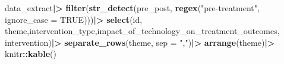 \documentclass[
]{article}
\newenvironment{Shaded}{\begin{snugshade}}{\end{snugshade}}
\newcommand{\AttributeTok}[1]{\textcolor[rgb]{0.13,0.29,0.53}{#1}}
\newcommand{\ConstantTok}[1]{\textcolor[rgb]{0.56,0.35,0.01}{#1}}
\newcommand{\FunctionTok}[1]{\textcolor[rgb]{0.13,0.29,0.53}{\textbf{#1}}}
\newcommand{\NormalTok}[1]{#1}
\newcommand{\SpecialCharTok}[1]{\textcolor[rgb]{0.81,0.36,0.00}{\textbf{#1}}}
\newcommand{\StringTok}[1]{\textcolor[rgb]{0.31,0.60,0.02}{#1}}
\begin{document}
\begin{Shaded}
\begin{Highlighting}[]
\NormalTok{data\_extract}\SpecialCharTok{|\textgreater{}}
  \FunctionTok{filter}\NormalTok{(}\FunctionTok{str\_detect}\NormalTok{(pre\_post, }\FunctionTok{regex}\NormalTok{(}\StringTok{"pre{-}treatment"}\NormalTok{, }\AttributeTok{ignore\_case =} \ConstantTok{TRUE}\NormalTok{)))}\SpecialCharTok{|\textgreater{}}
  \FunctionTok{select}\NormalTok{(id, theme,intervention\_type,impact\_of\_technology\_on\_treatment\_outcomes, intervention)}\SpecialCharTok{|\textgreater{}}
  \FunctionTok{separate\_rows}\NormalTok{(theme, }\AttributeTok{sep =} \StringTok{","}\NormalTok{)}\SpecialCharTok{|\textgreater{}}
  \FunctionTok{arrange}\NormalTok{(theme)}\SpecialCharTok{|\textgreater{}}
\NormalTok{  knitr}\SpecialCharTok{::}\FunctionTok{kable}\NormalTok{()}
\end{Highlighting}
\end{Shaded}
\end{document}

